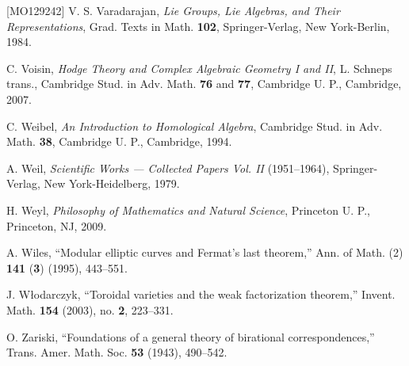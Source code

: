 \begin{thebibliography}{[MO129242]}
V. S. Varadarajan, \emph{Lie Groups, Lie Algebras, and Their Representations},
Grad. Texts in Math. \textbf{102}, Springer-Verlag, New York-Berlin, 1984.

C. Voisin, \emph{Hodge Theory and Complex Algebraic Geometry I and II},
L. Schneps trans., Cambridge Stud. in Adv. Math. \textbf{76} and
\textbf{77}, Cambridge U. P., Cambridge, 2007.

C. Weibel, \emph{An Introduction to Homological Algebra}, Cambridge Stud. in
Adv. Math. \textbf{38}, Cambridge U. P., Cambridge, 1994.

A. Weil, \emph{Scientific Works --- Collected Papers Vol. II} (1951--1964),
Springer-Verlag, New York-Heidelberg, 1979.

H. Weyl, \emph{Philosophy of Mathematics and Natural Science}, Princeton U.
P., Princeton, NJ, 2009.

A. Wiles, ``Modular elliptic curves and Fermat's last theorem,'' Ann. of
Math. (2) \textbf{141} (\textbf{3}) (1995), 443--551.

J. Włodarczyk, ``Toroidal varieties and the weak factorization theorem,''
Invent. Math. \textbf{154} (2003), no. \textbf{2}, 223--331.

O. Zariski, ``Foundations of a general theory of birational
correspondences,'' Trans. Amer. Math. Soc. \textbf{53} (1943), 490--542.

\end{thebibliography}
\endgroup
